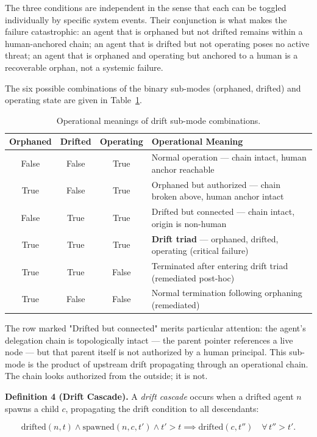 The three conditions are independent in the sense that each can be toggled individually by specific system events. Their conjunction is what makes the failure catastrophic: an agent that is orphaned but not drifted remains within a human-anchored chain; an agent that is drifted but not operating poses no active threat; an agent that is orphaned and operating but anchored to a human is a recoverable orphan, not a systemic failure.

The six possible combinations of the binary sub-modes (orphaned, drifted) and operating state are given in Table~\ref{tab:rs-drift-submodes}.

\begin{table}[h]
\centering
\begin{tabular}{c|c|c|p{4.8cm}}
\textbf{Orphaned} & \textbf{Drifted} & \textbf{Operating} & \textbf{Operational Meaning} \\ \hline
False & False & True  & Normal operation — chain intact, human anchor reachable \\
True  & False & True  & Orphaned but authorized — chain broken above, human anchor intact \\
False & True  & True  & Drifted but connected — chain intact, origin is non-human \\
True  & True  & True  & \textbf{Drift triad} — orphaned, drifted, operating (critical failure) \\
True  & True  & False & Terminated after entering drift triad (remediated post-hoc) \\
True  & False & False & Normal termination following orphaning (remediated)
\end{tabular}
\caption{Operational meanings of drift sub-mode combinations.}
\label{tab:rs-drift-submodes}
\end{table}

The row marked "Drifted but connected" merits particular attention: the agent's delegation chain is topologically intact — the parent pointer references a live node — but that parent itself is not authorized by a human principal. This sub-mode is the product of upstream drift propagating through an operational chain. The chain looks authorized from the outside; it is not.

\medskip
\noindent\textbf{Definition 4 (Drift Cascade).}
A \emph{drift cascade} occurs when a drifted agent $n$ spawns a child $c$, propagating the drift condition to all descendants:

\begin{equation}
\mathrm{drifted}(n, t) \land \mathrm{spawned}(n, c, t') \land t' > t \implies \mathrm{drifted}(c, t'')\quad \forall\, t'' > t'.
\label{eq:rs-drift-cascade}
\end{equation}

